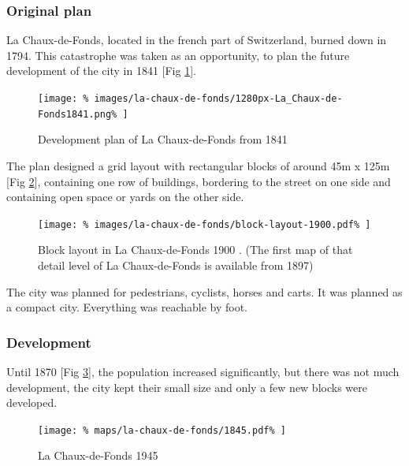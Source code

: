 \documentclass{article}
\begin{document}
		\begin{multicols}{2}
	      \raggedcolumns
		
			\subsubsection{Original plan}
			La Chaux-de-Fonds, located in the french part of Switzerland, burned down in 1794.
			This catastrophe was taken as an opportunity, to plan the future development of the city in 1841 [Fig \ref{fig:map:plan-la-chaux-de-fonds-1841}].
		
			\begin{figure}[H]
				\texttt{[image: \%
					images/la-chaux-de-fonds/1280px-La\_Chaux-de-Fonds1841.png\%
				]}
				\caption{Development plan of La Chaux-de-Fonds from 1841 \cite{Wikimedia:LaChauxDeFonds1841}}
				\label{fig:map:plan-la-chaux-de-fonds-1841}
			\end{figure}
			
			The plan designed a grid layout with rectangular blocks of around 45m x 125m [Fig \ref{fig:img:la-chaux-de-fonds-block-layout-1900}], containing one row of buildings, bordering to the street on one side and containing open space or yards on the other side.
			
			\begin{figure}[H]
				\texttt{[image: \%
					images/la-chaux-de-fonds/block-layout-1900.pdf\%
				]}
				\caption{Block layout in La Chaux-de-Fonds 1900  \cite{MapGeoAdmin:LaChauxDeFonds}. (The first map of that detail level of La Chaux-de-Fonds is available from 1897)}
				\label{fig:img:la-chaux-de-fonds-block-layout-1900}
			\end{figure}
			
			The city was planned for pedestrians, cyclists, horses and carts.
			It was planned as a compact city. Everything was reachable by foot.
			
			
			\subsubsection{Development}
			Until 1870 [Fig \ref{fig:map:la-chaux-de-fonds-1945}], the population increased significantly, but there was not much development, the city kept their small size and only a few new blocks were developed.
			
			\begin{figure}[H]
				\texttt{[image: \%
					maps/la-chaux-de-fonds/1845.pdf\%
				]}
				\caption{La Chaux-de-Fonds 1945  \cite{MapGeoAdmin:LaChauxDeFonds}}
				\label{fig:map:la-chaux-de-fonds-1945}
			\end{figure}	
			

\end{multicols}
\end{document}
